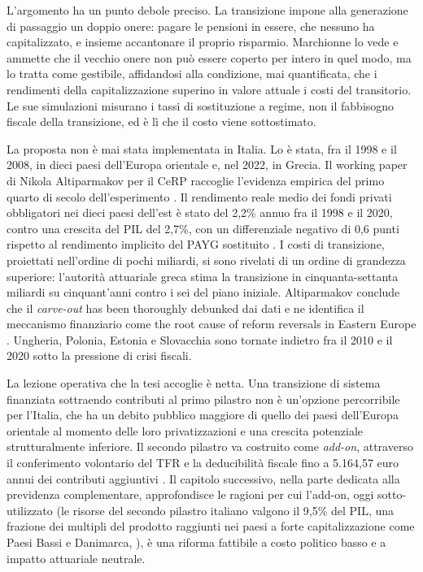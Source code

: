 \medskip
\noindent
L'argomento ha un punto debole preciso. La transizione impone alla generazione di
passaggio un doppio onere: pagare le pensioni in essere, che nessuno ha
capitalizzato, e insieme accantonare il proprio risparmio. Marchionne lo vede e
ammette che il vecchio onere non può essere coperto per intero in quel modo, ma lo
tratta come gestibile, affidandosi alla condizione, mai quantificata, che i
rendimenti della capitalizzazione superino in valore attuale i costi del
transitorio. Le sue simulazioni misurano i tassi di sostituzione a regime, non il
fabbisogno fiscale della transizione, ed è lì che il costo viene sottostimato.

\medskip
\noindent
La proposta non è mai stata implementata in Italia. Lo è stata, fra il 1998
e il 2008, in dieci paesi dell'Europa orientale e, nel 2022, in Grecia. Il
working paper di Nikola Altiparmakov per il CeRP raccoglie l'evidenza
empirica del primo quarto di secolo dell'esperimento \cite{Altiparmakov2022}.
Il rendimento reale medio dei fondi privati obbligatori nei dieci paesi dell'est è
stato del 2,2\% annuo fra il 1998 e il 2020, contro una crescita del PIL del 2,7\%,
con un differenziale negativo di 0,6 punti rispetto al rendimento implicito del PAYG
sostituito \cite{Altiparmakov2022}. I costi di transizione, proiettati nell'ordine
di pochi miliardi, si sono rivelati di un ordine di grandezza superiore: l'autorità
attuariale greca stima la transizione in cinquanta-settanta miliardi su cinquant'anni
contro i sei del piano iniziale. Altiparmakov conclude che il \emph{carve-out}
\guillemotleft{}has been thoroughly debunked \guillemotright{}dai dati e ne identifica il
meccanismo finanziario come \guillemotleft{}the root cause of reform reversals in Eastern
Europe \guillemotright{}\cite{Altiparmakov2022}. Ungheria, Polonia, Estonia e Slovacchia
sono tornate indietro fra il 2010 e il 2020 sotto la pressione di crisi fiscali.

\medskip
\noindent
La lezione operativa che la tesi accoglie è netta. Una transizione di
sistema finanziata sottraendo contributi al primo pilastro non è un'opzione
percorribile per l'Italia, che ha un debito pubblico maggiore di quello dei
paesi dell'Europa orientale al momento delle loro privatizzazioni e una
crescita potenziale strutturalmente inferiore. Il secondo pilastro va
costruito come \emph{add-on}, attraverso il conferimento volontario del TFR
e la deducibilità fiscale fino a 5.164,57 euro annui dei contributi
aggiuntivi \cite{MEF_RGS2025}. Il capitolo successivo, nella parte dedicata alla
previdenza complementare, approfondisce le ragioni per cui l'add-on, oggi sotto-utilizzato
(le risorse del secondo pilastro italiano valgono il 9,5\% del PIL, una
frazione dei multipli del prodotto raggiunti nei paesi a forte capitalizzazione
come Paesi Bassi e Danimarca, \citealp{FrancoTommasino2020}), è una
riforma fattibile a costo politico basso e a impatto attuariale neutrale.

